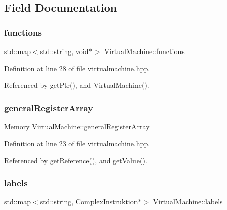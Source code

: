 \subsection{Field Documentation}
\mbox{\label{class_virtual_machine_a1b1e03784277347206641bf47e39d6d1}} 
\subsubsection{\texorpdfstring{functions}{functions}}
{\footnotesize\ttfamily std\+::map$<$std\+::string, void$\ast$$>$ Virtual\+Machine\+::functions\hspace{0.3cm}{\ttfamily [private]}}



Definition at line 28 of file virtualmachine.\+hpp.



Referenced by get\+Ptr(), and Virtual\+Machine().

\mbox{\label{class_virtual_machine_aae855da52e8f3b0a167b8fec497d44d9}} 
\subsubsection{\texorpdfstring{general\+Register\+Array}{generalRegisterArray}}
{\footnotesize\ttfamily \mbox{\hyperlink{class_memory}{Memory}} Virtual\+Machine\+::general\+Register\+Array\hspace{0.3cm}{\ttfamily [private]}}



Definition at line 23 of file virtualmachine.\+hpp.



Referenced by get\+Reference(), and get\+Value().

\mbox{\label{class_virtual_machine_a109df714b628452e9a958eddb28df6e9}} 
\subsubsection{\texorpdfstring{labels}{labels}}
{\footnotesize\ttfamily std\+::map$<$std\+::string, \mbox{\hyperlink{class_complex_instruktion}{Complex\+Instruktion}}$\ast$$>$ Virtual\+Machine\+::labels\hspace{0.3cm}{\ttfamily [private]}}




